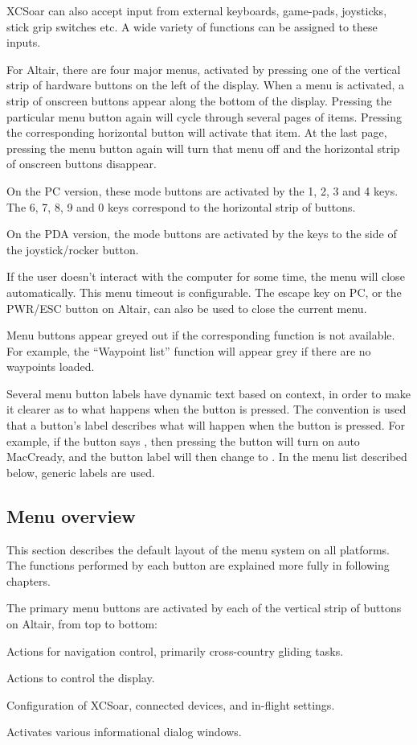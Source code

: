 XCSoar can also accept input from external keyboards, game-pads, joysticks,
stick grip switches etc. A wide variety of functions can be assigned to these
inputs.

For Altair, there are four major menus, activated by pressing one of
the vertical strip of hardware buttons on the left of the display.
When a menu is activated, a strip of onscreen buttons appear along the 
bottom of the display.  Pressing the particular menu button again will
cycle through several pages of items.  Pressing the corresponding
horizontal button will activate that item.  At the last page, pressing
the menu button again will turn that menu off and the horizontal strip
of onscreen buttons disappear.  

On the PC version, these mode buttons are activated by the
1, 2, 3 and 4 keys.  The 6, 7, 8, 9 and 0 keys correspond to the horizontal
strip of buttons.

On the PDA version, the mode buttons are activated by the keys to the
side of the joystick/rocker button.

If the user doesn't interact with the computer for some time, the
menu will close automatically.  This menu timeout is configurable.
The escape key on PC, or the PWR/ESC button on Altair, can
also be used to close the current menu.

Menu buttons appear greyed out if the corresponding function is not available. 
For example, the ``Waypoint list'' function will appear grey if there are no waypoints loaded.

Several menu button labels have dynamic text based on context, in
order to make it clearer as to what happens when the button is
pressed.  The convention is used that a button's label describes what
will happen when the button is pressed.  For example, if the button
says , then pressing the button will turn on auto
MacCready, and the button label will then change to . 
In the menu list described below, generic labels are used.

\subsection*{Menu overview}
This section describes the default layout of the menu system on all
platforms.  The functions performed by each button are explained more
fully in following chapters.

The primary menu buttons are activated by each of the vertical strip of buttons
on Altair, from top to bottom:
\begin{jspecs}
\item[\bmenu{Nav}] Actions for navigation control, primarily cross-country
gliding tasks.
\item[\bmenu{Display}] Actions to control the display.
\item[\bmenu{Config}] Configuration of XCSoar, connected devices, and in-flight
settings.
\item[\bmenu{Info}] Activates various informational dialog windows.
\end{jspecs}

